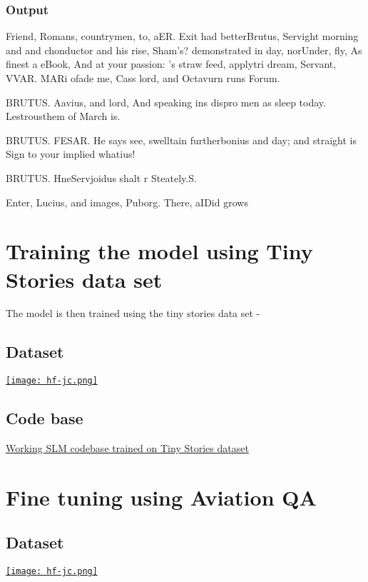 \documentclass[conference]{IEEEtran}
\begin{document}
\subsubsection{Output}

Friend, Romans, countrymen, to, aER.
Exit had betterBrutus, Servight morning and and chonductor and his rise,
Sham’s? demonstrated in day, norUnder, fly,
As finest a eBook,
And at your passion:
’s straw feed, applytri dream, Servant,
VVAR.
MARi ofade me,
Cass lord, and Octavurn runs Forum.

BRUTUS.
Aavius, and lord,
And speaking ins dispro men as sleep today.
Lestrousthem of March is.


BRUTUS.
FESAR.
He says see, swelltain furtherbonius and day; and straight is
Sign to your implied
whatius!

BRUTUS.
HneServjoidus shalt r Steately.S.



Enter, Lucius, and images, Puborg.
There, aIDid grows

\section{Training the model using Tiny Stories data set}
The model is then trained using the tiny stories data set -
\subsection{Dataset} 
    \href{https://huggingface.co/datasets/roneneldan/TinyStories}{
    \texttt{[image: hf-jc.png]}
    }

\subsection{Code base}
\href{https://colab.research.google.com/github/samratkar/samratkar.github.io/blob/main/_posts/concepts/genai/notes-codes/aeroslm/aeroslm-trg.ipynb}{Working SLM codebase trained on Tiny Stories dataset}

\section{Fine tuning using Aviation QA }
\subsection{Dataset} 
    \href{https://huggingface.co/datasets/sakharamg/AviationQA}{
    \texttt{[image: hf-jc.png]}
    }
\end{document}

